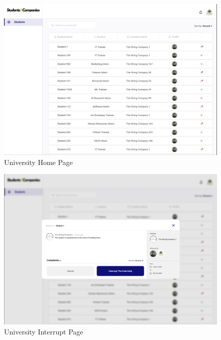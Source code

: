 \documentclass{article}
\begin{document}
\begin{figure}[H]
    \centering
    \includegraphics[scale = 0.40]{figures/UserInterfaces/University/UniversityHomePage.png}
    \caption{University Home Page}
     \centering
\end{figure}
\begin{figure}[H]
    \centering
    \includegraphics[scale = 0.40]{figures/UserInterfaces/University/Interrupt Page.png}
    \caption{University Interrupt Page}
     \centering
\end{figure}
\end{document}
